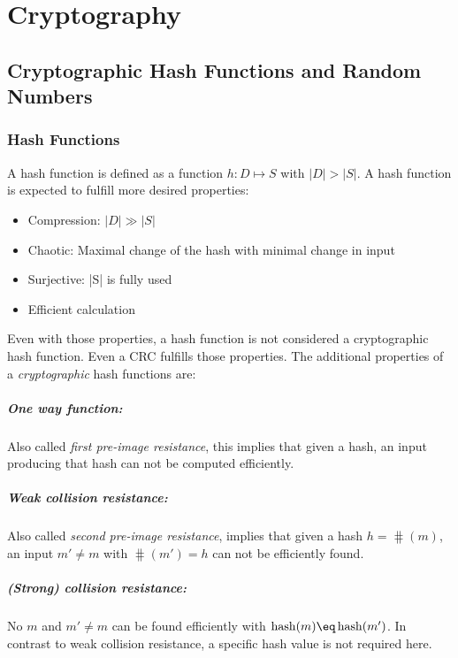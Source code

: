 \chapter{Cryptography}
\section{Cryptographic Hash Functions and Random Numbers}
\subsection{Hash Functions}
A hash function is defined as a function $h: D \mapsto S$ with $|D| > |S|$. A
hash function is expected to fulfill more desired properties:
\begin{itemize}
    \item Compression: $|D| \gg |S|$
    \item Chaotic: Maximal change of the hash with minimal change in input
    \item Surjective: |S| is fully used
    \item Efficient calculation
\end{itemize}
Even with those properties, a hash function is not considered a cryptographic
hash function. Even a CRC fulfills those properties. The additional properties
of a \emph{cryptographic} hash functions are:

\paragraph{One way function:} Also called \emph{first pre-image resistance},
    this implies that given a hash, an input producing that hash can not be
    computed efficiently.

\paragraph{Weak collision resistance:} Also called \emph{second pre-image
    resistance}, implies that given a hash $h = \hash(m)$, an input $m' \neq m$
    with $\hash(m') = h$ can not be efficiently found.

\paragraph{(Strong) collision resistance:} No $m$ and $m' \neq m$ can be found
    efficiently with $\hash(m) \eq \hash(m')$. In contrast to weak collision
    resistance, a specific hash value is not required here.

